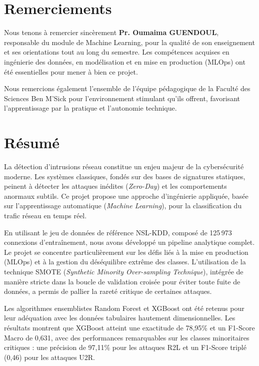 \documentclass[12pt,a4paper]{report}
\begin{document}

\chapter*{Remerciements}

Nous tenons à remercier sincèrement \textbf{Pr. Oumaima GUENDOUL}, responsable du module de Machine Learning, pour la qualité de son enseignement et ses orientations tout au long du semestre. Les compétences acquises en ingénierie des données, en modélisation et en mise en production (MLOps) ont été essentielles pour mener à bien ce projet.

Nous remercions également l'ensemble de l'équipe pédagogique de la Faculté des Sciences Ben M'Sick pour l'environnement stimulant qu'ils offrent, favorisant l'apprentissage par la pratique et l'autonomie technique.

\vspace{2cm}

\chapter*{Résumé}

La détection d'intrusions réseau constitue un enjeu majeur de la cybersécurité moderne. Les systèmes classiques, fondés sur des bases de signatures statiques, peinent à détecter les attaques inédites (\textit{Zero-Day}) et les comportements anormaux subtils. Ce projet propose une approche d'ingénierie appliquée, basée sur l'apprentissage automatique (\textit{Machine Learning}), pour la classification du trafic réseau en temps réel.

En utilisant le jeu de données de référence NSL-KDD, composé de 125\,973 connexions d'entraînement, nous avons développé un pipeline analytique complet. Le projet se concentre particulièrement sur les défis liés à la mise en production (MLOps) et à la gestion du déséquilibre extrême des classes. L'utilisation de la technique SMOTE (\textit{Synthetic Minority Over-sampling Technique}), intégrée de manière stricte dans la boucle de validation croisée pour éviter toute fuite de données, a permis de pallier la rareté critique de certaines attaques.

Les algorithmes ensemblistes Random Forest et XGBoost ont été retenus pour leur adéquation avec les données tabulaires hautement dimensionnelles. Les résultats montrent que XGBoost atteint une exactitude de 78,95\% et un F1-Score Macro de 0,631, avec des performances remarquables sur les classes minoritaires critiques : une précision de 97,11\% pour les attaques R2L et un F1-Score triplé (0,46) pour les attaques U2R.
\end{document}
